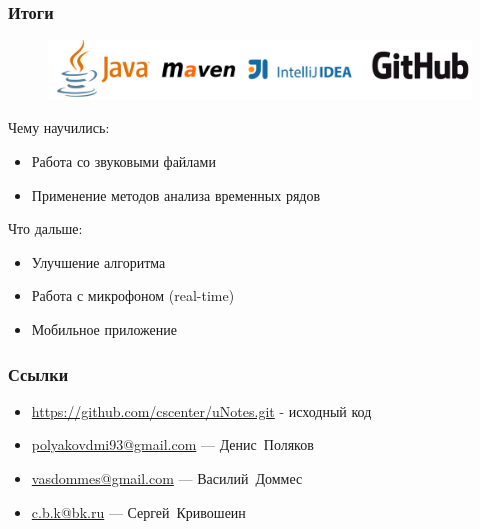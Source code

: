 \documentclass[11pt,slides,aspectratio=43]{beamer}%
\begin{document}
    \begin{frame}
	\frametitle{Итоги}
	   \begin{figure}[t!]
            \begin{center}
                \includegraphics[width =\textwidth]{logos.png}
            \end{center}
            \end{figure}
            
		Чему научились:
		\begin{itemize}
			\item Работа со звуковыми файлами
			\item Применение методов анализа временных рядов
		\end{itemize}
		Что дальше:
		\begin{itemize}
			\item Улучшение алгоритма
			\item Работа с микрофоном (real-time)
			\item Мобильное приложение
		\end{itemize}
	\end{frame}


    \begin{frame}
    \frametitle{Ссылки}
        \begin{itemize}
            \item \href{https://github.com/cscenter/uNotes.git}{https://github.com/cscenter/uNotes.git} - исходный код
            \item \href{polyakovdmi93@gmail.com}{polyakovdmi93@gmail.com} --- Денис~Поляков
            \item \href{vasdommes@gmail.com}{vasdommes@gmail.com}  --- Василий~Доммес
            \item \href{c.b.k@bk.ru}{c.b.k@bk.ru}  --- Сергей~Кривошеин
        \end{itemize}
	\end{frame}
\end{document}
